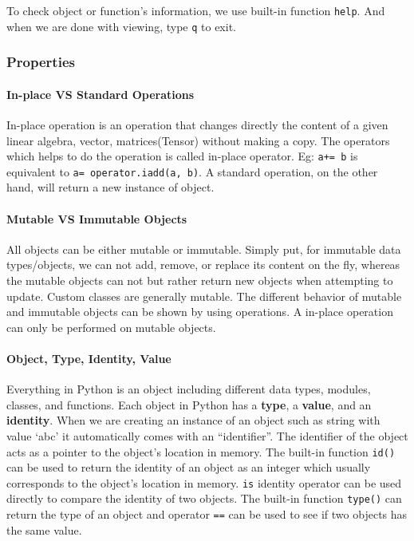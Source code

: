 \documentclass[../main.tex]{subfiles}
\begin{document}
To check object or function's information, we use built-in function \texttt{help}. And when we are done with viewing, type \texttt{q} to exit. 

\subsubsection{Properties}

\paragraph{In-place VS Standard Operations} In-place operation is an operation that changes directly the content of a given linear algebra, vector, matrices(Tensor) without making a copy. The operators which helps to do the operation is called in-place operator. Eg: \texttt{a+= b} is equivalent to \texttt{a= operator.iadd(a, b)}. A standard operation, on the other hand, will return a new instance of object. 

\paragraph{Mutable VS Immutable Objects} All objects can be either mutable or immutable. Simply put, for immutable data types/objects, we can not add, remove, or replace its content on the fly, whereas the mutable objects can not but rather return new objects when attempting to update.  Custom classes are generally mutable. The different behavior of mutable and immutable objects can be shown by using operations. A in-place operation can only be performed on mutable objects. 

\paragraph{Object, Type, Identity, Value}
Everything in Python is an object including different data types, modules, classes, and functions.  Each object in Python has a \textbf{type}, a \textbf{value}, and an \textbf{identity}.  When we are creating an instance of an object such as string with value `abc' it automatically comes with an ``identifier''. The identifier of the object acts as a pointer to the object's location in memory. The built-in function \texttt{id()} can be used to return the identity of an object as an integer which usually corresponds to the object's location in memory. \texttt{is} identity operator can be used directly to compare the identity of two objects. The built-in function \texttt{type()} can return the type of an object and operator \texttt{==} can be used to see if two objects has the same value.
\end{document}
